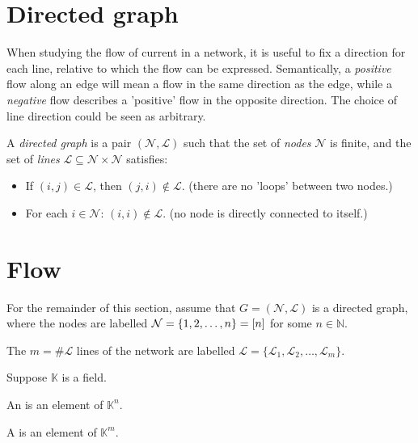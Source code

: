 \documentclass[main.tex]{subfiles}
\begin{document}
\section{Directed graph}
When studying the flow of current in a network, it is useful to fix a direction for each line, relative to which the flow can be expressed.
Semantically, a \emph{positive} flow along an edge will mean a flow in the same direction as the edge, while a \emph{negative} flow describes a 'positive' flow in the opposite direction. The choice of line direction could be seen as arbitrary. 
\begin{definition}
A \emph{directed graph} is a pair $(\mathcal{N},\mathcal{L})$ such that the set of \emph{nodes} $\mathcal{N}$ is finite, and the set of \emph{lines} $\mathcal{L}\subseteq \mathcal{N} \times \mathcal{N}$ satisfies:
\begin{itemize}
    \item If $(i,j) \in \mathcal{L}$, then $(j,i) \notin \mathcal{L}$. (\ie there are no 'loops' between two nodes.)
    \item For each $i \in \mathcal{N}$: $(i,i) \notin \mathcal{L}$. (\ie no node is directly connected to itself.)
\end{itemize}
\end{definition}

\section{Flow}
For the remainder of this section, assume that $G=(\mathcal{N},\mathcal{L})$ is a directed graph, where the nodes are labelled $\mathcal{N}=\{1,2,\dots,n\}=[n]$ for some $n \in \mathbb{N}$.

The $m = \# \mathcal{L}$ lines of the network are labelled $\mathcal{L}=\{\mathcal{L}_1,\mathcal{L}_2,\dots,\mathcal{L}_m\}$.

Suppose $\mathbb{K}$ is a field.

\begin{definition}
An  is an element of $\mathbb{K}^n$.
\end{definition}
\begin{definition}
A  is an element of $\mathbb{K}^m$.
\end{definition}


\end{document}
